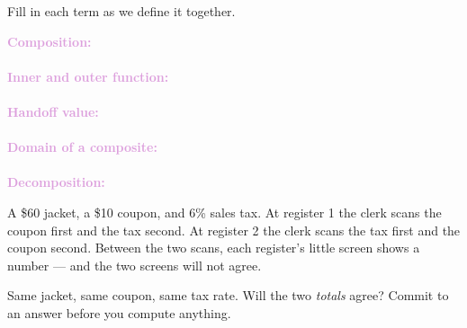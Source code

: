 \documentclass[10pt]{article}
\begin{document}

\vspace{0.12in}

\boxguard
\begin{vocabbox}
Fill in each term as we define it together.
\par\vspace{2pt}
\noindent\textbf{\textcolor{plum}{Composition:}}\\[1pt]
\\[3pt]
\noindent\textbf{\textcolor{plum}{Inner and outer function:}}\\[1pt]
\\[3pt]
\noindent\textbf{\textcolor{plum}{Handoff value:}}\\[1pt]
\\[3pt]
\noindent\textbf{\textcolor{plum}{Domain of a composite:}}\\[1pt]
\\[3pt]
\noindent\textbf{\textcolor{plum}{Decomposition:}}\\[1pt]
\end{vocabbox}

\vspace{0.1in}

\boxguard
\begin{hookbox}
A \$60 jacket, a \$10 coupon, and 6\% sales tax. At register 1 the clerk scans
the coupon first and the tax second. At register 2 the clerk scans the tax first
and the coupon second. Between the two scans, each register's little screen shows
a number --- and the two screens will not agree.

Same jacket, same coupon, same tax rate. Will the two \textit{totals} agree?
Commit to an answer before you compute anything.
\end{hookbox}
\end{document}
